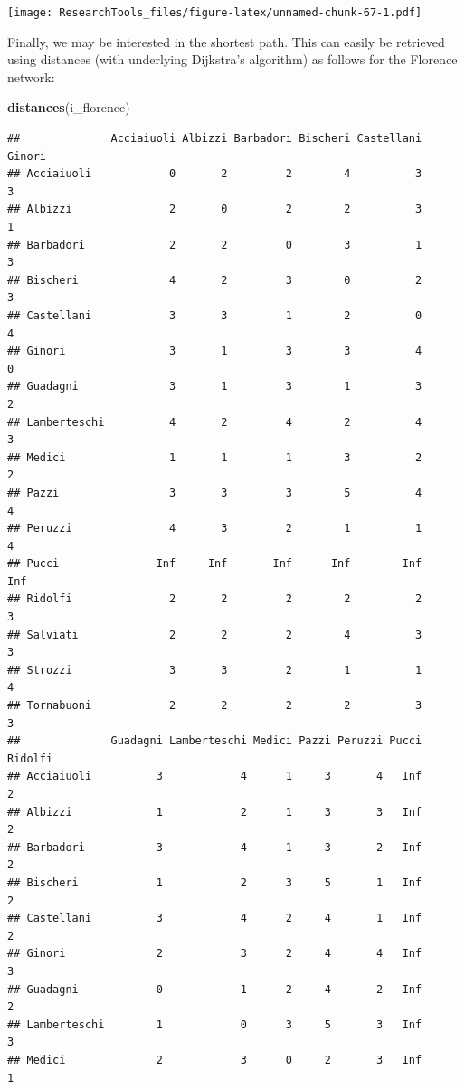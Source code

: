\documentclass[]{article}
\newenvironment{Shaded}{\begin{snugshade}}{\end{snugshade}}
\newcommand{\KeywordTok}[1]{\textcolor[rgb]{0.13,0.29,0.53}{\textbf{{#1}}}}
\newcommand{\NormalTok}[1]{{#1}}
\theoremstyle{definition}
\theoremstyle{definition}
\theoremstyle{definition}
\theoremstyle{remark}
\begin{document}
\texttt{[image: ResearchTools\_files/figure-latex/unnamed-chunk-67-1.pdf]}

Finally, we may be interested in the shortest path. This can easily be
retrieved using distances (with underlying Dijkstra's algorithm) as
follows for the Florence network:

\begin{Shaded}
\begin{Highlighting}[]
\KeywordTok{distances}\NormalTok{(i_florence)}
\end{Highlighting}
\end{Shaded}

\begin{verbatim}
##              Acciaiuoli Albizzi Barbadori Bischeri Castellani Ginori
## Acciaiuoli            0       2         2        4          3      3
## Albizzi               2       0         2        2          3      1
## Barbadori             2       2         0        3          1      3
## Bischeri              4       2         3        0          2      3
## Castellani            3       3         1        2          0      4
## Ginori                3       1         3        3          4      0
## Guadagni              3       1         3        1          3      2
## Lamberteschi          4       2         4        2          4      3
## Medici                1       1         1        3          2      2
## Pazzi                 3       3         3        5          4      4
## Peruzzi               4       3         2        1          1      4
## Pucci               Inf     Inf       Inf      Inf        Inf    Inf
## Ridolfi               2       2         2        2          2      3
## Salviati              2       2         2        4          3      3
## Strozzi               3       3         2        1          1      4
## Tornabuoni            2       2         2        2          3      3
##              Guadagni Lamberteschi Medici Pazzi Peruzzi Pucci Ridolfi
## Acciaiuoli          3            4      1     3       4   Inf       2
## Albizzi             1            2      1     3       3   Inf       2
## Barbadori           3            4      1     3       2   Inf       2
## Bischeri            1            2      3     5       1   Inf       2
## Castellani          3            4      2     4       1   Inf       2
## Ginori              2            3      2     4       4   Inf       3
## Guadagni            0            1      2     4       2   Inf       2
## Lamberteschi        1            0      3     5       3   Inf       3
## Medici              2            3      0     2       3   Inf       1

\end{verbatim}
\end{document}
